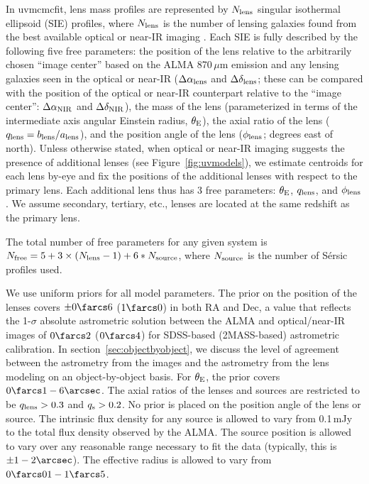 \documentclass[iop]{emulateapj}
\begin{document}
In {\sc uvmcmcfit}, lens mass profiles are represented by $N_{\rm lens}$
singular isothermal ellipsoid (SIE) profiles, where $N_{\rm lens}$ is the
number of lensing galaxies found from the best available optical or near-IR
imaging \citep[a multitude of evidence supports the SIE as a reasonable choice;
for a recent review, see][]{Treu:2010fk}.  Each SIE is fully described by the
following five free parameters: the position of the lens relative to the
arbitrarily chosen ``image center'' based on the ALMA 870$\,\mu$m emission and
any lensing galaxies seen in the optical or near-IR ($\Delta \alpha_{\rm lens}$
and $\Delta \delta_{\rm lens}$; these can be compared with the position of the
optical or near-IR counterpart relative to the ``image center'': $\Delta
\alpha_{\rm NIR}$ and $\Delta \delta_{\rm NIR}$), the mass of the lens
(parameterized in terms of the intermediate axis angular Einstein radius,
$\theta_{\rm E}$), the axial ratio of the lens ($q_{\rm lens} = b_{\rm lens} /
a_{\rm lens}$), and the position angle of the lens ($\phi_{\rm lens}$; degrees
east of north).  Unless otherwise stated, when optical or near-IR imaging
suggests the presence of additional lenses (see Figure~\ref{fig:uvmodels}), we
estimate centroids for each lens by-eye and fix the positions of the additional
lenses with respect to the primary lens.  Each additional lens thus has 3 free
parameters: $\theta_{\rm E}$, $q_{\rm lens}$, and $\phi_{\rm lens}$.  We assume
secondary, tertiary, etc., lenses are located at the same redshift as the
primary lens.  

The total number of free parameters for any given system is $N_{\rm free} = 5 +
3 \times (N_{\rm lens} - 1) + 6 * N_{\rm source}$, where $N_{\rm source}$ is
the number of S\'ersic profiles used.

We use uniform priors for all model parameters.  The prior on the position of
the lenses covers $\pm0\farcs6$ ($1\farcs0$) in both RA and Dec, a value that
reflects the 1-$\sigma$ absolute astrometric solution between the ALMA and
optical/near-IR images of $0\farcs2$ ($0\farcs4$) for SDSS-based (2MASS-based)
astrometric calibration.  In section~\ref{sec:objectbyobject}, we discuss the
level of agreement between the astrometry from the images and the astrometry
from the lens modeling on an object-by-object basis.  For $\theta_{\rm E}$, the
prior covers $0\farcs1 - 6\arcsec$.  The axial ratios of the lenses and sources
are restricted to be $q_{\rm lens} > 0.3$ and $q_{\rm s} > 0.2$. No prior is
placed on the position angle of the lens or source.  The intrinsic flux density
for any source is allowed to vary from 0.1$\,$mJy to the total flux density
observed by the ALMA.  The source position is allowed to vary over any
reasonable range necessary to fit the data (typically, this is $\pm
1-2\arcsec$).  The effective radius is allowed to vary from $0\farcs01 -
1\farcs5$.
\end{document}
